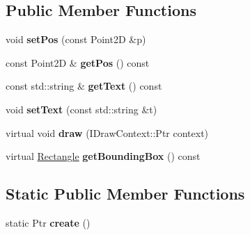 \subsection*{Public Member Functions}
\begin{DoxyCompactItemize}
\item 
\hypertarget{classsambag_1_1disco_1_1graphic_elements_1_1_text_af27f5e6e70e6b1379e5724d2fb8742ca}{
void {\bfseries setPos} (const Point2D \&p)}
\label{classsambag_1_1disco_1_1graphic_elements_1_1_text_af27f5e6e70e6b1379e5724d2fb8742ca}

\item 
\hypertarget{classsambag_1_1disco_1_1graphic_elements_1_1_text_a2bf62cdc8ed92262db56388a2127e57d}{
const Point2D \& {\bfseries getPos} () const }
\label{classsambag_1_1disco_1_1graphic_elements_1_1_text_a2bf62cdc8ed92262db56388a2127e57d}

\item 
\hypertarget{classsambag_1_1disco_1_1graphic_elements_1_1_text_ab73f32dd227c78ddefb5357522ab2baf}{
const std::string \& {\bfseries getText} () const }
\label{classsambag_1_1disco_1_1graphic_elements_1_1_text_ab73f32dd227c78ddefb5357522ab2baf}

\item 
\hypertarget{classsambag_1_1disco_1_1graphic_elements_1_1_text_a7c5920f2c6400af383946f1b062eec3c}{
void {\bfseries setText} (const std::string \&t)}
\label{classsambag_1_1disco_1_1graphic_elements_1_1_text_a7c5920f2c6400af383946f1b062eec3c}

\item 
\hypertarget{classsambag_1_1disco_1_1graphic_elements_1_1_text_af3d987555f6e629c3c31b7c90d6c4b0b}{
virtual void {\bfseries draw} (IDrawContext::Ptr context)}
\label{classsambag_1_1disco_1_1graphic_elements_1_1_text_af3d987555f6e629c3c31b7c90d6c4b0b}

\item 
\hypertarget{classsambag_1_1disco_1_1graphic_elements_1_1_text_ae7ed81493c7b96404916ab79fc1bffab}{
virtual \hyperlink{classsambag_1_1com_1_1_rectangle}{Rectangle} {\bfseries getBoundingBox} () const }
\label{classsambag_1_1disco_1_1graphic_elements_1_1_text_ae7ed81493c7b96404916ab79fc1bffab}

\end{DoxyCompactItemize}
\subsection*{Static Public Member Functions}
\begin{DoxyCompactItemize}
\item 
\hypertarget{classsambag_1_1disco_1_1graphic_elements_1_1_text_a1fd50ac4a2b3aaa7a5151079efa2f414}{
static Ptr {\bfseries create} ()}
\label{classsambag_1_1disco_1_1graphic_elements_1_1_text_a1fd50ac4a2b3aaa7a5151079efa2f414}

\end{DoxyCompactItemize}
